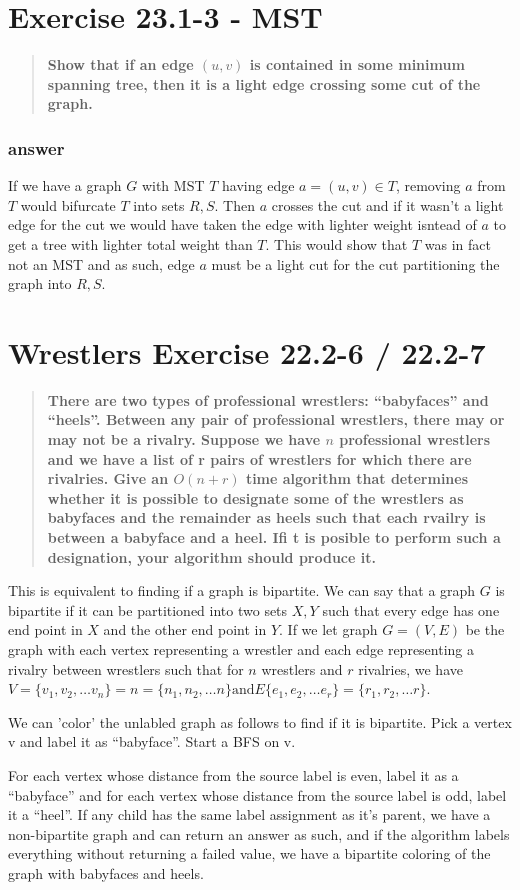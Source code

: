 \documentclass[titlepage]{article}\usepackage[]{graphicx}\usepackage[]{color}
\begin{document}
\section{ Exercise 23.1-3 - MST} 
\begin{quote}
  \textbf{Show that if an edge $(u,v)$ is contained in some minimum spanning
  tree, then it is a light edge crossing some cut of the graph.}
\end{quote}
\subsubsection{answer}
If we have a graph $G$ with MST $T$ having edge $a = (u,v) \in T$, removing $a$
from $T$ would bifurcate $T$ into sets $R,S$. Then $a$ crosses the cut and if
it wasn't a light edge for the cut we would have taken the edge with lighter
weight isntead of $a$ to get a tree with lighter total weight than $T$. This
would show that $T$ was in fact not an MST and as such, edge $a$ must be a
light cut for the cut partitioning the graph into $R,S$. 




\section{Wrestlers Exercise 22.2-6 / 22.2-7 } 
\begin{quote}
  \textbf{There are two types of professional wrestlers: ``babyfaces'' and
  ``heels''. Between any pair of professional wrestlers, there may or may not
be a rivalry. Suppose we have $n$ professional wrestlers and we have a list of
r pairs of wrestlers for which there are rivalries. Give an $O(n + r)$ time
algorithm that determines whether it is possible to designate some of the
wrestlers as babyfaces and the remainder as heels such that each rvailry is
between a babyface and a heel. Ifi t is posible to perform such a designation,
your algorithm should produce it.}
\end{quote}

This is equivalent to finding if a graph is bipartite. We can say that a graph
$G$ is bipartite if it can be partitioned into two sets $X,Y$ such that every
edge has one end point in $X$ and the other end point in $Y$. 
If we let graph $G = (V,E)$ be the graph with each vertex representing a
wrestler and each edge representing a rivalry between wrestlers such that for
$n$ wrestlers and $r$ rivalries, we have 
$V = \{v_1, v_2, \dots v_n\} = n = \{n_1, n_2, \dots n\} \text{and} E \{e_1, e_2, \dots e_r\} = \{r_1, r_2, \dots r \}$.  

We can 'color' the unlabled graph as follows to find if it is bipartite. Pick a
vertex v and label it as ``babyface''. Start a BFS on v. 

For each vertex whose distance from the source label is even, label it as a
``babyface'' and for each vertex whose distance from the source label is odd, label
it a ``heel''. If any child has the same label assignment as it's parent, we
have a non-bipartite graph and can return an answer as such, and if the
algorithm labels everything without returning a failed value, we have a
bipartite coloring of the graph with babyfaces and heels.
\end{document}
